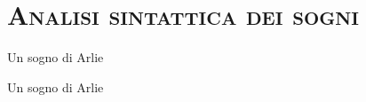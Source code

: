 \documentclass[xcolor=x11names,compress]{beamer}
\begin{document}
\section{\scshape Analisi sintattica dei sogni}
{
\begin{frame}[t]{Un sogno di Arlie}
    \vspace{-0.2cm}
    
\end{frame}}

{
\begin{frame}[t]{Un sogno di Arlie}
    \vspace{-0.2cm}
    
\end{frame}}
\end{document}
